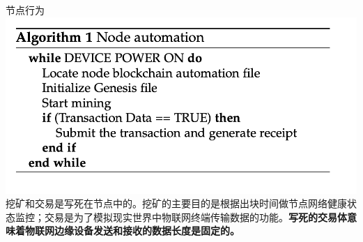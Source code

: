\documentclass{beamer}
\begin{document}
\begin{frame}{节点行为}
	\includegraphics[width=\linewidth]{Assets/算法1}
	挖矿和交易是写死在节点中的。挖矿的主要目的是根据出块时间做节点网络健康状态监控；交易是为了模拟现实世界中物联网终端传输数据的功能。\textbf{写死的交易体意味着物联网边缘设备发送和接收的数据长度是固定的。}
\end{frame}

	
\end{document}

